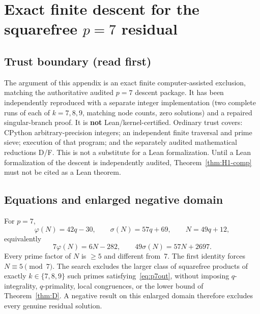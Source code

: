 \documentclass[11pt,reqno]{amsart}
\newcommand{\ph}{\varphi}
\newcommand{\sig}{\sigma}
\theoremstyle{definition}
\begin{document}
\appendix

\section{Exact finite descent for the squarefree \(p=7\) residual}
\label{app:p7}

\subsection{Trust boundary (read first)}
\label{app:p7-trust}
The argument of this appendix is an exact finite computer-assisted exclusion, matching the authoritative audited \(p=7\) descent package. It has been independently reproduced with a separate integer implementation (two complete runs of each of \(k=7,8,9\), matching node counts, zero solutions) and a repaired singular-branch proof. It is \textbf{not} Lean/kernel-certified. Ordinary trust covers: CPython arbitrary-precision integers; an independent finite traversal and prime sieve; execution of that program; and the separately audited mathematical reductions D/F. This is not a substitute for a Lean formalization. Until a Lean formalization of the descent is independently audited, Theorem~\ref{thm:H1-comp} must not be cited as a Lean theorem.

\subsection{Equations and enlarged negative domain}
For \(p=7\),
\[
\ph(N)=42q-30,\qquad \sig(N)=57q+69,\qquad N=49q+12,
\]
equivalently
\begin{equation}
\label{eq:p7out}
7\ph(N)=6N-282,\qquad 49\sig(N)=57N+2697.
\end{equation}
Every prime factor of \(N\) is \(\ge 5\) and different from~7. The first identity forces \(N\equiv 5\pmod 7\). The search excludes the larger class of squarefree products of exactly \(k\in\{7,8,9\}\) such primes satisfying~\eqref{eq:p7out}, without imposing \(q\)-integrality, \(q\)-primality, local congruences, or the lower bound of Theorem~\ref{thm:D}. A negative result on this enlarged domain therefore excludes every genuine residual solution.
\end{document}
